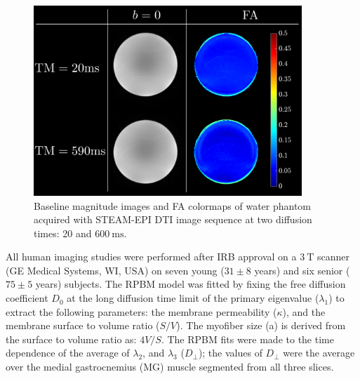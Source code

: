 \begin{figure}[!htb]
\vspace{+0.2cm}
\centering
\includegraphics[width=0.9\textwidth]{Figures/STEAM_Phantom.pdf}
\caption[Baseline magnitude images and FA colormaps of water phantom acquired with STEAM-EPI DTI image sequence at two diffusion times]{Baseline magnitude images and FA colormaps of water phantom acquired with STEAM-EPI DTI image sequence at two diffusion times: 20 and $\SI{600}{\milli\second}$.}
\label{fig:STEAM phantom}
\end{figure}

All human imaging studies were performed after IRB approval on a $\SI{3}{\tesla}$ scanner (GE Medical Systems, WI, USA) on seven young ($31 \pm 8$ years) and six senior ($75 \pm 5$ years) subjects. 
The RPBM model was fitted by fixing the free diffusion coefficient $D_0$ at the long diffusion time limit of the primary eigenvalue ($\lambda_1$) to extract the following parameters: the membrane permeability ($\kappa$), and the membrane surface to volume ratio ($S/V$). 
The myofiber size (a) is derived from the surface to volume ratio as: $4V/S$. 
The RPBM fits were made to the time dependence of the average of $\lambda_2$, and $\lambda_3$ ($D_{\perp}$); the values of $D_{\perp}$ were the average over the medial gastrocnemius (MG) muscle segmented from all three slices.
